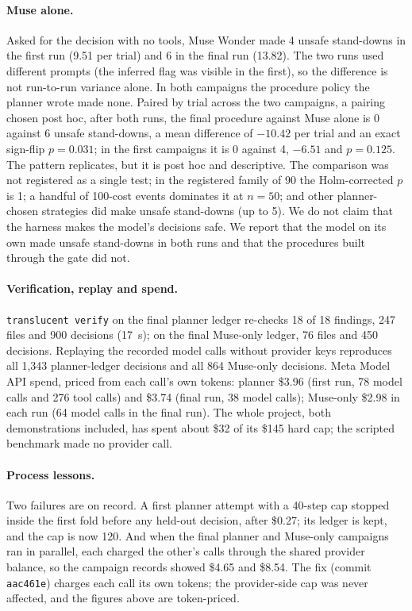 \documentclass[11pt]{article}
\newcommand{\cmd}[1]{\texttt{#1}}
\begin{document}
\paragraph{Muse alone.} Asked for the decision with no tools, Muse Wonder made 4 unsafe stand-downs in the first run
(9.51 per trial) and 6 in the final run (13.82). The two runs used different prompts (the inferred flag was visible in
the first), so the difference is not run-to-run variance alone. In both campaigns the procedure policy the planner
wrote made none. Paired by trial across the two campaigns, a pairing chosen post hoc, after both runs, the final procedure
against Muse alone is 0 against 6
unsafe stand-downs, a mean difference of $-10.42$ per trial and an exact sign-flip $p = 0.031$; in the first
campaigns it is 0 against 4, $-6.51$ and $p = 0.125$. The pattern replicates, but it is post hoc and descriptive. The
comparison was not registered as a single test; in the registered family of 90 the Holm-corrected $p$ is 1; a handful of 100-cost
events dominates it at $n = 50$; and other planner-chosen strategies did make unsafe stand-downs (up to 5). We do not
claim that the harness makes the model's decisions safe. We report that the model on its own made unsafe stand-downs
in both runs and that the procedures built through the gate did not.

\paragraph{Verification, replay and spend.} \cmd{translucent verify} on the final planner ledger re-checks 18 of 18
findings, 247 files and 900 decisions (17~s); on the final Muse-only ledger, 76 files and 450 decisions. Replaying the
recorded model calls without provider keys reproduces all 1{,}343 planner-ledger decisions and all 864 Muse-only
decisions. Meta Model API spend, priced from each call's own tokens: planner \$3.96 (first run, 78 model calls and 276
tool calls) and \$3.74 (final run, 38 model calls); Muse-only \$2.98 in each run (64 model calls in the final run).
The whole project, both demonstrations included, has spent about \$32 of its \$145 hard cap; the scripted benchmark
made no provider call.

\paragraph{Process lessons.} Two failures are on record. A first planner attempt with a 40-step cap stopped inside
the first fold before any held-out decision, after \$0.27; its ledger is kept, and the cap is now 120. And when the
final planner and Muse-only campaigns ran in parallel, each charged the other's calls through the shared provider
balance, so the campaign records showed \$4.65 and \$8.54. The fix (commit \texttt{aac461e}) charges each call its own
tokens; the provider-side cap was never affected, and the figures above are token-priced.
\end{document}
